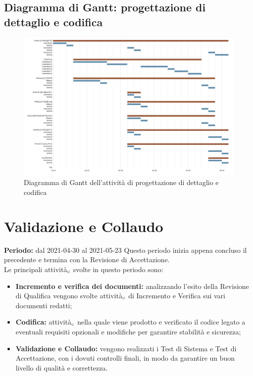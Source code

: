 \subsection{Diagramma di Gantt: progettazione di dettaglio e codifica}\label{PianificazioneDiagrammaDiGanttProgettazioneDettaglio}
\begin{figure}[!h]
	\begin{center}
		\includegraphics[width=1\linewidth]{../immagini/pdp/gantt_progettazione_dettaglio3.png}
		\caption{Diagramma di Gantt dell'attività di progettazione di dettaglio e codifica}
	\end{center}
\end{figure}
\clearpage
\section{Validazione e Collaudo}\label{PianificazioneValidazione}
\textbf{Periodo:} dal 2021-04-30 al 2021-05-23
Questo periodo inizia appena concluso il precedente e termina con la Revisione di Accettazione.\\

Le principali attività$_{\scaleto{G}{3pt}}$ svolte in questo periodo sono:
\begin{itemize}
	\item \textbf{Incremento e verifica dei documenti:} analizzando l'esito della Revisione di Qualifica vengono svolte attività$_{\scaleto{G}{3pt}}$ di Incremento e Verifica sui vari documenti redatti;
	\item \textbf{Codifica:} attività$_{\scaleto{G}{3pt}}$ nella quale viene prodotto e verificato il codice legato a eventuali requisiti opzionali e modifiche per garantire stabilità e sicurezza;
	\item \textbf{Validazione e Collaudo:} vengono realizzati i Test di Sistema e Test di Accettazione, con i dovuti controlli finali, in modo da garantire un buon livello di qualità e correttezza.
\end{itemize}

